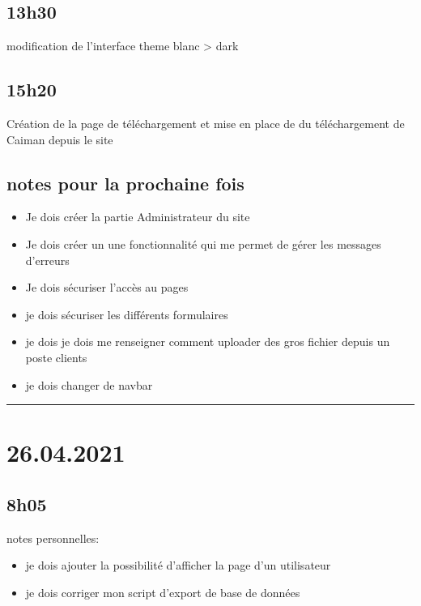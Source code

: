 \documentclass[a4paper,12pt,french]{sphinxmanual}
\begin{document}
\subsection{13h30}
\label{\detokenize{logbook:id24}}
\sphinxAtStartPar
modification de l’interface theme blanc \sphinxhyphen{}> dark


\subsection{15h20}
\label{\detokenize{logbook:id25}}
\sphinxAtStartPar
Création de la page de téléchargement et mise en place de du téléchargement de Caiman depuis le site


\subsection{notes pour la prochaine fois}
\label{\detokenize{logbook:notes-pour-la-prochaine-fois}}\begin{itemize}
\item {} 
\sphinxAtStartPar
Je dois créer la partie Administrateur du site

\item {} 
\sphinxAtStartPar
Je dois créer un une fonctionnalité qui me permet de gérer les messages d’erreurs

\item {} 
\sphinxAtStartPar
Je dois sécuriser l’accès au pages

\item {} 
\sphinxAtStartPar
je dois sécuriser les différents formulaires

\item {} 
\sphinxAtStartPar
je dois je dois me renseigner comment uploader des gros fichier depuis un poste clients

\item {} 
\sphinxAtStartPar
je dois changer de navbar

\end{itemize}


\bigskip\hrule\bigskip



\section{26.04.2021}
\label{\detokenize{logbook:id26}}

\subsection{8h05}
\label{\detokenize{logbook:id27}}
\sphinxAtStartPar
notes personnelles:
\begin{itemize}
\item {} 
\sphinxAtStartPar
je dois ajouter la possibilité d’afficher la page d’un utilisateur

\item {} 
\sphinxAtStartPar
je dois corriger mon script d’export de base de données

\end{itemize}
\end{document}
